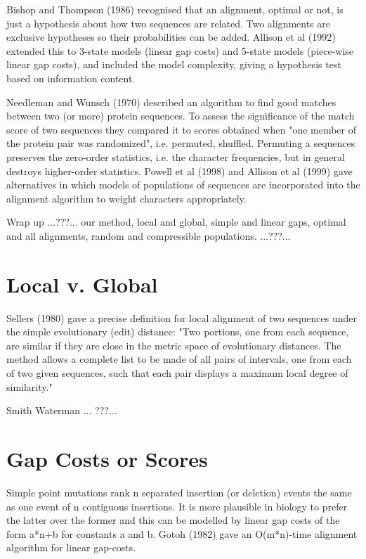 \documentclass[letterpaper,11pt,oneside]{article}
\begin{document}
Bishop and Thompson (1986) recognised that an alignment, optimal or not,
is just a hypothesis about how two sequences are related.
Two alignments are exclusive hypotheses so their probabilities
can be added. Allison et al (1992) extended this to
3-state models (linear gap costs) and
5-state models (piece-wise linear gap costs),
and included the model complexity,
giving a hypothesis test based on information content.

Needleman and Wunsch (1970) described an algorithm to find good matches between
two (or more) protein sequences.
To assess the significance of the match score of two sequences
they compared it to scores obtained
when "one member of the protein pair was randomized", i.e. permuted, shuffled.
Permuting a sequences preserves the zero-order statistics,
i.e. the character frequencies, but
in general destroys higher-order statistics.
Powell et al (1998) and Allison et al (1999) gave alternatives in which models
of populations of sequences are incorporated into the alignment algorithm
to weight characters appropriately.

Wrap up ...???...  our method,
local and global,
simple and linear gaps,
optimal and all alignments,
random and compressible populations. ...???...


\section{Local v. Global}

Sellers (1980) gave a precise definition for local alignment
of two sequences under the simple evolutionary (edit) distance:
"Two portions, one from each sequence, are similar if they are close
in the metric space of evolutionary distances. The method allows
a complete list to be made of all pairs of intervals,
one from each of two given sequences, such that each pair
displays a maximum local degree of similarity."

Smith Waterman ... ???...


\section{Gap Costs or Scores}

Simple point mutations rank n separated insertion (or deletion) events
the same as one event of n contiguous insertions.
It is more plausible in biology to prefer the latter over the former and
this can be modelled by linear gap costs of the form a*n+b for
constants a and b.
Gotoh (1982) gave an O(m*n)-time alignment algorithm for linear gap-costs.
\end{document}
